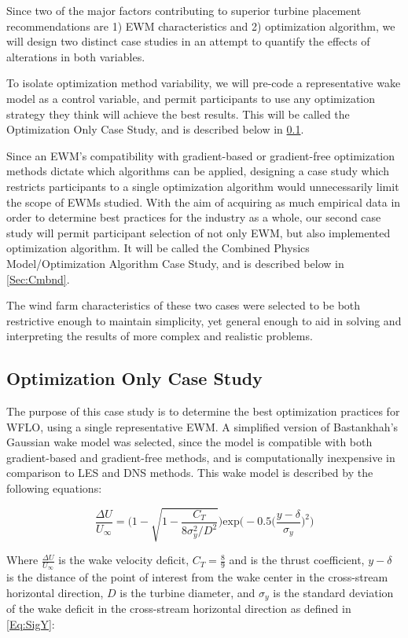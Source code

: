 \documentclass[]{aiaa-tc}
\begin{document}
Since two of the major factors contributing to superior turbine placement recommendations are 1) EWM characteristics and 2) optimization algorithm, we will design two distinct case studies in an attempt to quantify the effects of alterations in both variables.

To isolate optimization method variability, we will pre-code a representative wake model as a control variable, and permit participants to use any optimization strategy they think will achieve the best results. This will be called the Optimization Only Case Study, and is described below in \cref{Sec:OptOnly}.

Since an EWM's compatibility with gradient-based or gradient-free optimization methods dictate which algorithms can be applied, designing a case study which restricts participants to a single optimization algorithm would unnecessarily limit the scope of EWMs studied. With the aim of acquiring as much empirical data in order to determine best practices for the industry as a whole, our second case study will permit participant selection of not only EWM, but also implemented optimization algorithm. It will be called the Combined Physics Model/Optimization Algorithm Case Study, and is described below in \cref{Sec:Cmbnd}.

The wind farm characteristics of these two cases were selected to be both restrictive enough to maintain simplicity, yet general enough to aid in solving and interpreting the results of more complex and realistic problems.
\bigskip
\subsection{Optimization Only Case Study}
\label{Sec:OptOnly}
The purpose of this case study is to determine the best optimization practices for WFLO, using a single representative EWM. A simplified version of Bastankhah's Gaussian wake model \cite{Bastankhah2016, Thomas2018} was selected, since the model is compatible with both gradient-based and gradient-free methods, and is computationally inexpensive in comparison to LES and DNS methods. This wake model is described by the following equations:

\begin{equation}
	\frac{\Delta U}{U_{\infty}}
	=
	\Bigg(
	1 - \sqrt{
		1 - \frac{C_T}
		{8\sigma_{y}^{2}/D^2}
	}
	\Bigg)
	\text{exp}\bigg(
	-0.5\Big(
		\frac{y-\delta}{\sigma_{y}}
		\Big)^2
	\bigg)
\end{equation}

\noindent Where $\frac{\Delta U}{U_{\infty}}$ is the wake velocity deficit, $C_T = \frac{8}{9}$ and is the thrust coefficient, $y-\delta$ is the distance of the point of interest from the wake center in the cross-stream horizontal direction, $D$ is the turbine diameter, and $\sigma_y$ is the standard deviation of the wake deficit in the cross-stream horizontal direction as defined in \cref{Eq:SigY}:
\end{document}
